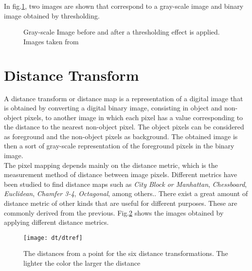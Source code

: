In fig.\ref{fig:thres1}, two images are shown that correspond to a gray-scale image
and binary image obtained by thresholding.

\begin{figure}[h t b p ! H]
  \centering
\qquad
  \caption{Gray-scale Image before and after a thresholding effect is applied. Images taken from \cite{web:thresholding}}
  \label{fig:thres1}
\end{figure}

\section{Distance Transform}
\label{sec:dt}

A distance transform or distance map is a representation of a digital image
that is obtained by converting a digital binary image, consisting in object
and non-object pixels, to another image in which each pixel has a value
corresponding to the distance to the nearest non-object pixel. The object 
pixels can be considered as foreground and the non-object pixels as
background. The obtained image is then a sort of gray-scale representation
of the foreground pixels in the binary image.\\
The pixel mapping depends mainly on the distance metric, which is the 
measurement method of distance between image pixels. Different metrics have been 
studied to find distance maps such as 
\emph{City Block or Manhattan},
\emph{Chessboard}, \emph{Euclidean}, \emph{Chamfer 3-4}, \emph{Octagonal}, among
others.\cite[p.363]{dtresearch}. There exist a great amount of
distance metric of other kinds that are useful for different purposes.
These are commonly derived from the previous.
Fig.\ref{fig:dtexamples} shows the images obtained by applying different distance metrics.

\begin{figure}[h t b p ! H]
 \centering
   \texttt{[image: dt/dtref]}
 \caption{The distances from a point for the six distance transformations.
 The lighter the color the larger the distance \cite[p.365]{dtresearch}}
 \label{fig:dtexamples}
\end{figure}

